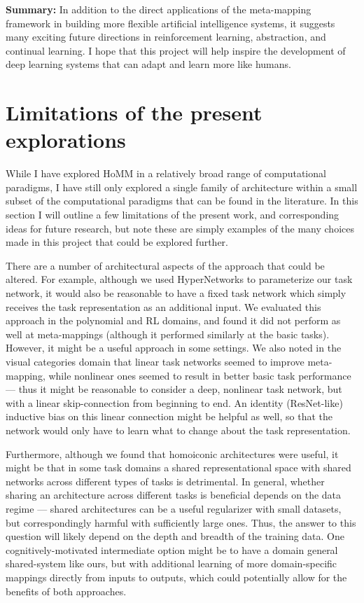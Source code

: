 \textbf{Summary:} In addition to the direct applications of the meta-mapping framework in building more flexible artificial intelligence systems, it suggests many exciting future directions in reinforcement learning, abstraction, and continual learning. I hope that this project will help inspire the development of deep learning systems that can adapt and learn more like humans. \par 

\section{Limitations of the present explorations}

While I have explored HoMM in a relatively broad range of computational paradigms, I have still only explored a single family of architecture within a small subset of the computational paradigms that can be found in the literature. In this section I will outline a few limitations of the present work, and corresponding ideas for future research, but note these are simply examples of the many choices made in this project that could be explored further. \par

There are a number of architectural aspects of the approach that could be altered. For example, although we used HyperNetworks to parameterize our task network, it would also be reasonable to have a fixed task network which simply receives the task representation as an additional input. We evaluated this approach in the polynomial and RL domains, and found it did not perform as well at meta-mappings (although it performed similarly at the basic tasks). However, it might be a useful approach in some settings. We also noted in the visual categories domain that linear task networks seemed to improve meta-mapping, while nonlinear ones seemed to result in better basic task performance --- thus it might be reasonable to consider a deep, nonlinear task network, but with a linear skip-connection from beginning to end. An identity (ResNet-like) inductive bias on this linear connection might be helpful as well, so that the network would only have to learn what to change about the task representation. \par 

Furthermore, although we found that homoiconic architectures were useful, it might be that in some task domains a shared representational space with shared networks across different types of tasks is detrimental. In general, whether sharing an architecture across different tasks is beneficial depends on the data regime --- shared architectures can be a useful regularizer with small datasets, but correspondingly harmful with sufficiently large ones. Thus, the answer to this question will likely depend on the depth and breadth of the training data. One cognitively-motivated intermediate option might be to have a domain general shared-system like ours, but with additional learning of more domain-specific mappings directly from inputs to outputs, which could potentially allow for the benefits of both approaches.\oar

